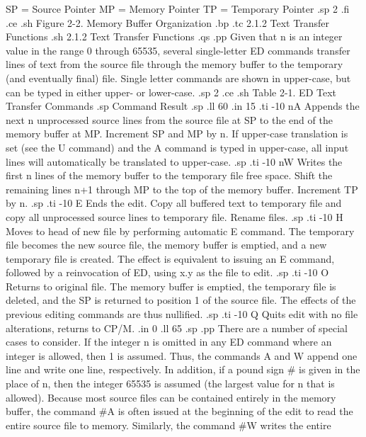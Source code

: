                         SP = Source Pointer
                        MP = Memory Pointer
                        TP = Temporary Pointer  
.sp 2
.fi
.ce
.sh
Figure 2-2.  Memory Buffer Organization
.bp
.tc         2.1.2  Text Transfer Functions
.sh
2.1.2  Text Transfer Functions
.qs
.pp
Given that n is an integer value in the range 0 through 65535, several 
single-letter ED commands transfer lines of text from the source file through 
the memory buffer to the temporary (and eventually final) file.  Single letter 
commands are shown in upper-case, but can be typed in either upper- or 
lower-case.
.sp 2
.ce
.sh
Table 2-1.  ED Text Transfer Commands
.sp
   Command                          Result
.sp
.ll 60
.in 15
.ti -10
nA        Appends the next n unprocessed source lines from the source file at 
SP to the end of the memory buffer at MP.  Increment SP and MP by n.  If 
upper-case translation is set (see the U command) and the A command is typed 
in upper-case, all input lines will automatically be translated to upper-case.
.sp
.ti -10
nW        Writes the first n lines of the memory buffer to the temporary 
file free space.  Shift the remaining lines n+1 through MP to the top of the 
memory buffer.  Increment TP by n.
.sp
.ti -10
E         Ends the edit.  Copy all buffered text to temporary file and copy 
all unprocessed source lines to temporary file.  Rename files. 
.sp
.ti -10
H         Moves to head of new file by performing automatic E command.  The
temporary file becomes the new source file, the memory buffer is emptied, and 
a new temporary file is created.  The effect is equivalent to issuing an E 
command, followed by a reinvocation of ED, using x.y as the file to edit.
.sp
.ti -10
O         Returns to original file.  The memory buffer is emptied, the 
temporary file is deleted, and the SP is returned to position 1 of the 
source file.  The effects of the previous editing commands are thus nullified.
.sp
.ti -10
Q         Quits edit with no file alterations, returns to CP/M.
.in 0
.ll 65
.sp
.pp
There are a number of special cases to consider.  If the integer n is omitted 
in any ED command where an integer is allowed, then 1 is assumed.  Thus, the 
commands A and W append one line and write one line, respectively.  In 
addition, if a pound sign # is given in the place of n, then the integer 
65535 is assumed (the largest value for n that is allowed).  Because most 
source files can be contained entirely in the memory buffer, 
the command #A is often issued at the beginning of the edit to read the 
entire source file to memory.  Similarly, the command #W writes the entire 
